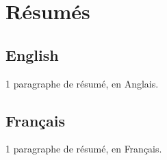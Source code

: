 \chapter*{Résumés}
\section*{English}

1 paragraphe de résumé, en Anglais. \lipsum[1]


\section*{Français}

1 paragraphe de résumé, en Français. \lipsum[1]

